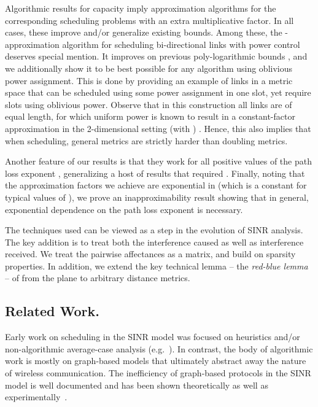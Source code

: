 \documentclass[11pt]{amsart}
\begin{document}
Algorithmic results for capacity imply approximation algorithms for the corresponding
scheduling problems with an extra multiplicative  factor. In all cases,
these improve and/or generalize existing bounds. Among these, the -approximation
algorithm for scheduling bi-directional links with power control deserves special mention.
It improves on previous poly-logarithmic bounds \cite{KV10,FKRV09}, and we additionally
show it to be best possible for any algorithm using oblivious power assignment.
This is done by providing an example of links in a metric space that can be scheduled using some
power assignment in one slot, yet require 
slots using oblivious power. 
Observe that in this construction all links are of equal length, for
which uniform power is known to result in a constant-factor
approximation in the 2-dimensional setting (with ) \cite{us:esa09full}. Hence,
this also implies that when scheduling, general metrics are strictly
harder than doubling metrics. 

Another feature of our results is that they work for all positive values of the path loss exponent , generalizing
a host of results that required .
Finally, noting that the approximation factors we achieve are exponential in  (which is a constant
for typical values of ), we 
prove an inapproximability result showing that in general,
exponential dependence on the path loss exponent 
is necessary.



The techniques used can be viewed as a step in the evolution of 
SINR analysis. The key addition is to treat both the
interference caused as well as interference received. We treat the
pairwise affectances as a matrix, and build on sparsity properties.
In addition, we extend the key technical lemma -- the \emph{red-blue
  lemma} -- of \cite{GHWW09,HW09} from the plane to arbitrary distance metrics.

\subsection{Related Work.}

Early work on scheduling in the SINR model was focused on heuristics
and/or non-algorithmic average-case analysis (e.g.~\cite{kumar00}). 
In contrast, the body of algorithmic work is mostly on graph-based models
that ultimately abstract away the nature of wireless communication.
The inefficiency of graph-based protocols in the SINR model is
well documented and has been shown theoretically as well as
experimentally~\cite{MaheshwariJD08,Moscibroda2006Protocol}.
\end{document}
